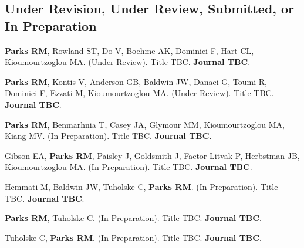 \subsection*{Under Revision, Under Review, Submitted, or In Preparation}

\noindent \textbf{Parks RM}, Rowland ST, Do V, Boehme AK, Dominici F, Hart CL, Kioumourtzoglou MA. (Under Review). Title TBC. \textbf{Journal TBC}. \bigskip

\noindent \textbf{Parks RM}, Kontis V, Anderson GB, Baldwin JW, Danaei G, Toumi R, Dominici F, Ezzati M, Kioumourtzoglou MA. (Under Review). Title TBC. \textbf{Journal TBC}. \bigskip

\noindent \textbf{Parks RM}, Benmarhnia T, Casey JA, Glymour MM, Kioumourtzoglou MA, Kiang MV. (In Preparation). Title TBC. \textbf{Journal TBC}. \bigskip

\noindent Gibson EA, \textbf{Parks RM}, Paisley J, Goldsmith J, Factor-Litvak P, Herbstman JB, Kioumourtzoglou MA. (In Preparation). Title TBC. \textbf{Journal TBC}. \bigskip

\noindent Hemmati M, Baldwin JW, Tuholske C, \textbf{Parks RM}. (In Preparation). Title TBC. \textbf{Journal TBC}. \bigskip

\noindent \textbf{Parks RM}, Tuholske C. (In Preparation). Title TBC. \textbf{Journal TBC}. \bigskip

\noindent Tuholske C, \textbf{Parks RM}. (In Preparation). Title TBC. \textbf{Journal TBC}.


